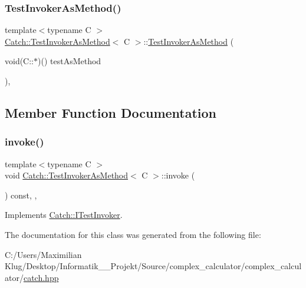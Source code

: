 \subsubsection{\texorpdfstring{Test\+Invoker\+As\+Method()}{TestInvokerAsMethod()}}
{\footnotesize\ttfamily template$<$typename C $>$ \\
\mbox{\hyperlink{class_catch_1_1_test_invoker_as_method}{Catch\+::\+Test\+Invoker\+As\+Method}}$<$ C $>$\+::\mbox{\hyperlink{class_catch_1_1_test_invoker_as_method}{Test\+Invoker\+As\+Method}} (\begin{DoxyParamCaption}\item[{void(C\+::$\ast$)()}]{test\+As\+Method }\end{DoxyParamCaption})\hspace{0.3cm}{\ttfamily [inline]}, {\ttfamily [noexcept]}}



\subsection{Member Function Documentation}
\mbox{\label{class_catch_1_1_test_invoker_as_method_a8115a06efe273f4112ec0b5452c1b5f2}} 
\subsubsection{\texorpdfstring{invoke()}{invoke()}}
{\footnotesize\ttfamily template$<$typename C $>$ \\
void \mbox{\hyperlink{class_catch_1_1_test_invoker_as_method}{Catch\+::\+Test\+Invoker\+As\+Method}}$<$ C $>$\+::invoke (\begin{DoxyParamCaption}{ }\end{DoxyParamCaption}) const\hspace{0.3cm}{\ttfamily [inline]}, {\ttfamily [override]}, {\ttfamily [virtual]}}



Implements \mbox{\hyperlink{struct_catch_1_1_i_test_invoker_a6fcd5c5b67d6d5ade6491ff33411ca7f}{Catch\+::\+I\+Test\+Invoker}}.



The documentation for this class was generated from the following file\+:\begin{DoxyCompactItemize}
\item 
C\+:/\+Users/\+Maximilian Klug/\+Desktop/\+Informatik\+\_\+\_\+\+Projekt/\+Source/complex\+\_\+calculator/complex\+\_\+calculator/\mbox{\hyperlink{catch_8hpp}{catch.\+hpp}}\end{DoxyCompactItemize}
